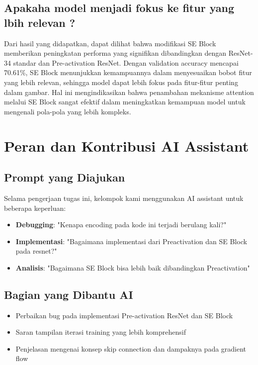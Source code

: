 \documentclass[11pt,a4paper]{article}
\begin{document}
\subsection{Apakaha model menjadi fokus ke fitur yang lbih relevan ?}
Dari hasil yang didapatkan, dapat dilihat bahwa modifikasi SE Block memberikan peningkatan performa yang signifikan dibandingkan dengan ResNet-34 standar dan Pre-activation ResNet. Dengan validation accuracy mencapai 70.61\%, SE Block menunjukkan kemampuannya dalam menyesuaikan bobot fitur yang lebih relevan, sehingga model dapat lebih fokus pada fitur-fitur penting dalam gambar. Hal ini mengindikasikan bahwa penambahan mekanisme attention melalui SE Block sangat efektif dalam meningkatkan kemampuan model untuk mengenali pola-pola yang lebih kompleks.

\section{Peran dan Kontribusi AI Assistant}

\subsection{Prompt yang Diajukan}

Selama pengerjaan tugas ini, kelompok kami menggunakan AI assistant untuk beberapa keperluan:

\begin{itemize}
	\item \textbf{Debugging}: "Kenapa encoding pada kode ini terjadi berulang kali?"
    \item \textbf{Implementasi}: "Bagaimana implementasi dari Preactivation dan SE Block pada resnet?"
    \item \textbf{Analisis}: "Bagaimana SE Block bisa lebih baik dibandingkan Preactivation"
\end{itemize}

\subsection{Bagian yang Dibantu AI}

\begin{itemize}
    \item Perbaikan bug pada implementasi Pre-activation ResNet dan SE Block
    \item Saran tampilan iterasi training yang lebih komprehensif
    \item Penjelasan mengenai konsep skip connection dan dampaknya pada gradient flow
\end{itemize}
\end{document}
